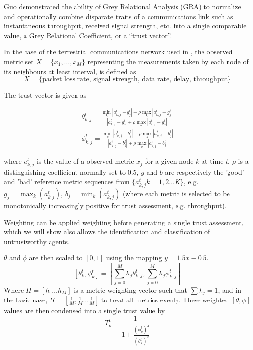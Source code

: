 \documentclass[runningheads,a4paper]{llncs}
\begin{document}
Guo\cite{Guo2012} demonstrated the ability of Grey Relational Analysis (GRA)\cite{Zuo1995} to normalize and operationally combine disparate traits of a communications link such as instantaneous throughput, received signal strength, etc. into a single comparable value, a Grey Relational Coefficient, or a ``trust vector''.

In the case of the terrestrial communications network used in \cite{Guo2012}, the observed metric set $X = \{x_1,\dots,x_M\}$ representing the measurements taken by each node of its neighbours at least interval, is defined as 
\begin{equation}
  \label{eq:terrmetrics}
  X=\{\text{packet loss rate, signal strength, data rate, delay, throughput}\}
\end{equation}

The trust vector is given as

\begin{align}
  \label{eq:grc}
  \theta_{k,j}^t = \frac{\min_k|a_{k,j}^t - g_j^t| + \rho \max_k|a_{k,j}^t-g_j^t|}{|a_{k,j}^t-g_j^t| + \rho \max_k|a_{k,j}^t-g_j^t|} \\
  \phi_{k,j}^t = \frac{\min_k|a_{k,j}^t - b_j^t| + \rho \max_k|a_{k,j}^t-b_j^t|}{|a_{k,j}^t-b_j^t| + \rho \max_k|a_{k,j}^t-b_j^t|} 
\end{align}

where $a_{k,j}^t$ is the value of a observed metric $x_j$ for a given node $k$ at time $t$, $\rho$ is a distinguishing coefficient normally set to $0.5$, $g$ and $b$ are respectively the 'good' and 'bad' reference metric sequences from $\{a_{k,j}^t k=1,2\dots K\}$, e.g. $g_j=\max_k({a_{k,j}^t})$,  $b_j=\min_k({a_{k,j}^t})$ (where each metric is selected to be monotonically increasingly positive for trust assessment, e.g. throughput). 

Weighting can be applied weighting before generating a single trust assessment, which we will show also allows the identification and classification of untrustworthy agents.

$\theta$ and $\phi$ are then scaled to $[0,1]$ using the mapping $y = 1.5 x - 0.5$.
\begin{equation}
  \label{eq:metric_weighting}
  [\theta_k^t, \phi_k^t] = \left[\sum_{j=0}^M h_j \theta_{k,j}^t,\sum_{j=0}^M h_j \phi_{k,j}^t \right]
\end{equation}
Where $H=[h_0\dots h_M]$ is a metric weighting vector such that $\sum h_j = 1$, and in the basic case, $H=[\frac{1}{M},\frac{1}{M}\dots\frac{1}{M}]$ to treat all metrics evenly.
These weighted $[\theta,\phi]$ values are then condensed into a single trust value by
\begin{equation}
  \label{eq:trustvalue}
  T_k^t = \frac{1}{1+\frac{(\phi_k^t)^2}{(\theta_k^t)^2}}
\end{equation}
\end{document}
